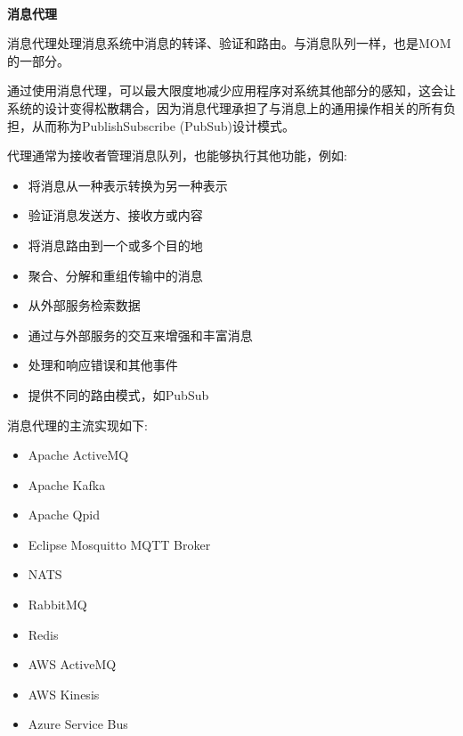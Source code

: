 \hspace*{\fill} \\ %
\noindent
\textbf{消息代理}

消息代理处理消息系统中消息的转译、验证和路由。与消息队列一样，也是MOM的一部分。

通过使用消息代理，可以最大限度地减少应用程序对系统其他部分的感知，这会让系统的设计变得松散耦合，因为消息代理承担了与消息上的通用操作相关的所有负担，从而称为PublishSubscribe (PubSub)设计模式。

代理通常为接收者管理消息队列，也能够执行其他功能，例如:

\begin{itemize}
\item 
将消息从一种表示转换为另一种表示

\item 
验证消息发送方、接收方或内容

\item 
将消息路由到一个或多个目的地

\item 
聚合、分解和重组传输中的消息

\item 
从外部服务检索数据

\item 
通过与外部服务的交互来增强和丰富消息

\item 
处理和响应错误和其他事件

\item 
提供不同的路由模式，如PubSub
\end{itemize}

消息代理的主流实现如下:

\begin{itemize}
\item 
Apache ActiveMQ

\item 
Apache Kafka

\item 
Apache Qpid

\item 
Eclipse Mosquitto MQTT Broker

\item 
NATS

\item 
RabbitMQ

\item 
Redis

\item 
AWS ActiveMQ

\item 
AWS Kinesis

\item 
Azure Service Bus
\end{itemize}

